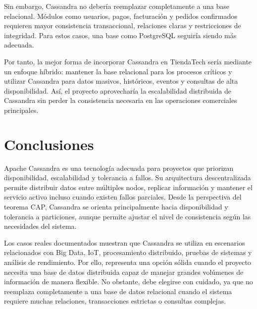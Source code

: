 \documentclass[12pt,a4paper]{article}
\begin{document}
Sin embargo, Cassandra no debería reemplazar completamente a una base relacional. Módulos como usuarios, pagos, facturación y pedidos confirmados requieren mayor consistencia transaccional, relaciones claras y restricciones de integridad. Para estos casos, una base como PostgreSQL seguiría siendo más adecuada.

Por tanto, la mejor forma de incorporar Cassandra en TiendaTech sería mediante un enfoque híbrido: mantener la base relacional para los procesos críticos y utilizar Cassandra para datos masivos, históricos, eventos y consultas de alta disponibilidad. Así, el proyecto aprovecharía la escalabilidad distribuida de Cassandra sin perder la consistencia necesaria en las operaciones comerciales principales.

\section{Conclusiones}

Apache Cassandra es una tecnología adecuada para proyectos que priorizan disponibilidad, escalabilidad y tolerancia a fallos. Su arquitectura descentralizada permite distribuir datos entre múltiples nodos, replicar información y mantener el servicio activo incluso cuando existen fallos parciales. Desde la perspectiva del teorema CAP, Cassandra se orienta principalmente hacia disponibilidad y tolerancia a particiones, aunque permite ajustar el nivel de consistencia según las necesidades del sistema.

Los casos reales documentados muestran que Cassandra se utiliza en escenarios relacionados con Big Data, IoT, procesamiento distribuido, pruebas de sistemas y análisis de rendimiento. Por ello, representa una opción sólida cuando el proyecto necesita una base de datos distribuida capaz de manejar grandes volúmenes de información de manera flexible. No obstante, debe elegirse con cuidado, ya que no reemplaza completamente a una base de datos relacional cuando el sistema requiere muchas relaciones, transacciones estrictas o consultas complejas.

\printbibliography
\end{document}
